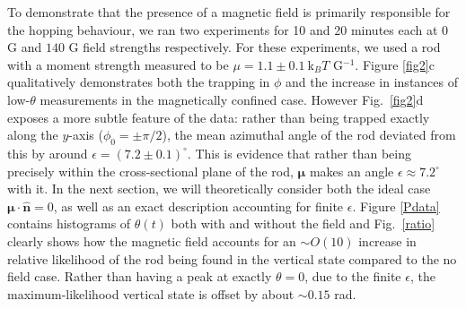\documentclass[aps,prl,reprint,twocolumn,superscriptaddress,showpacs]{revtex4-1}
\newcommand{\hvcrm}[1]{\mathbf{\hat{#1}}}
\newcommand{\vc}[1]{\boldsymbol{#1}}
\newcommand{\kk}{\mathrm{k}_B}
\begin{document}
To demonstrate that the presence of a magnetic field is primarily responsible for the hopping behaviour, we ran two experiments for 10 and 20 minutes each at $0$ G and $140$ G field strengths respectively. For these experiments, we used a rod with a moment strength measured to be $\mu = 1.1\pm0.1\ \kk T$ G$^{-1}$. Figure \ref{fig2}c qualitatively demonstrates both the trapping in $\phi$ and the increase in instances of low-$\theta$ measurements in the magnetically confined case. However Fig.\ \ref{fig2}d exposes a more subtle feature of the data: rather than being trapped exactly along the $y$-axis ($\phi_0=\pm\pi/2$), the mean azimuthal angle of the rod deviated from this by around $\epsilon = (7.2\pm 0.1)^\circ$. This is evidence that rather than being precisely within the cross-sectional plane of the rod, $\vc{\mu}$ makes an angle $\epsilon\approx 7.2^\circ$ with it. In the next section, we will theoretically consider both the ideal case $\vc{\mu}\cdot\hvcrm{n}=0$, as well as an exact description accounting for finite $\epsilon$. Figure \ref{Pdata} contains histograms of $\theta(t)$ both with and without the field and Fig.\ \ref{ratio} clearly shows how the magnetic field accounts for an $\sim O(10)$ increase in relative likelihood of the rod being found in the vertical state compared to the no field case. Rather than having a peak at exactly $\theta=0$, due to the finite $\epsilon$, the maximum-likelihood vertical state is offset by about $\sim 0.15$ rad. 

%
%
%
%
%
%
%
\end{document}
